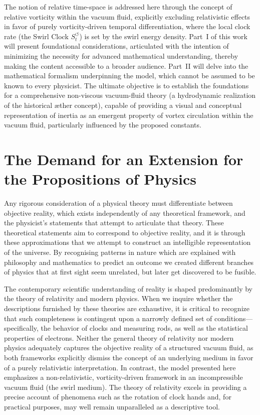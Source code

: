 \documentclass[10pt,reprint,aps,onecolumn,nofootinbib]{revtex4-2}
\begin{document}
    The notion of relative time-space is addressed here through the concept of relative vorticity within the vacuum fluid, explicitly excluding relativistic effects in favor of purely vorticity-driven temporal differentiation, where the local clock rate (the Swirl Clock \(S_t^{\boldsymbol{\circlearrowleft}}\)) is set by the swirl energy density. Part~I of this work will present foundational considerations, articulated with the intention of minimizing the necessity for advanced mathematical understanding, thereby making the content accessible to a broader audience. Part~II will delve into the mathematical formalism underpinning the model, which cannot be assumed to be known to every physicist. The ultimate objective is to establish the foundations for a comprehensive non-viscous vacuum-fluid theory (a hydrodynamic realization of the historical æther concept), capable of providing a visual and conceptual representation of inertia as an emergent property of vortex circulation within the vacuum fluid, particularly influenced by the proposed constants.


    \section{The Demand for an Extension for the Propositions of Physics}

        Any rigorous consideration of a physical theory must differentiate between objective reality, which exists independently of any theoretical framework, and the physicist's statements that attempt to articulate that theory. These theoretical statements aim to correspond to objective reality, and it is through these approximations that we attempt to construct an intelligible representation of the universe. By recognising patterns in nature which are explained with philosophy and mathematics to predict an outcome we created different branches of physics that at first sight seem unrelated, but later get discovered to be fusible.

        The contemporary scientific understanding of reality is shaped predominantly by the theory of relativity and modern physics. When we inquire whether the descriptions furnished by these theories are exhaustive, it is critical to recognize that such completeness is contingent upon a narrowly defined set of conditions---specifically, the behavior of clocks and measuring rods, as well as the statistical properties of electrons. Neither the general theory of relativity nor modern physics adequately captures the objective reality of a structured vacuum fluid, as both frameworks explicitly dismiss the concept of an underlying medium in favor of a purely relativistic interpretation. In contrast, the model presented here emphasizes a non-relativistic, vorticity-driven framework in an incompressible vacuum fluid (the swirl medium). The theory of relativity excels in providing a precise account of phenomena such as the rotation of clock hands and, for practical purposes, may well remain unparalleled as a descriptive tool.
\end{document}
